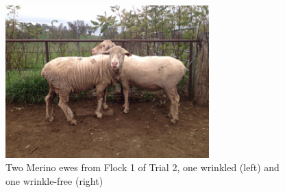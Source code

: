 %

\begin{figure}[!h]
  \centering
 \captionsetup{width=0.7\textwidth}
  \includegraphics[width=0.7\textwidth,angle=180]{IMG_0322.JPG}
  \caption{Two Merino ewes from Flock 1 of Trial 2, one wrinkled (left) and one wrinkle-free (right)}
  \label{fig:sheep}
\end{figure}

%

